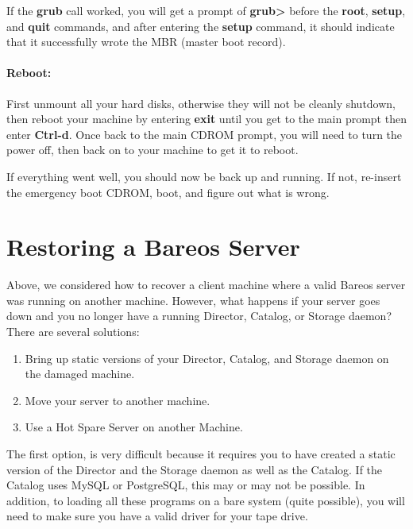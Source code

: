 If the {\bf grub} call worked, you will get a prompt of {\bf grub{\textgreater}}
before the {\bf root}, {\bf setup}, and {\bf quit} commands, and after
entering the {\bf setup} command, it should indicate that it successfully
wrote the MBR (master boot record).


\paragraph*{Reboot:}

First unmount all your hard disks, otherwise they will not be cleanly
shutdown, then reboot your machine by entering {\bf exit} until you get to the
main prompt then enter {\bf Ctrl-d}. Once back to the main CDROM prompt, you
will need to turn the power off, then back on to your machine to get it to
reboot.

If everything went well, you should now be back up and running. If not,
re-insert the emergency boot CDROM, boot, and figure out what is wrong.

\label{restore_server}
\section{Restoring a Bareos Server}

Above, we considered how to recover a client machine where a valid Bareos
server was running on another machine. However, what happens if your server
goes down and you no longer have a running Director, Catalog, or Storage
daemon? There are several solutions:

\begin{enumerate}
\item Bring up static versions of your Director, Catalog, and Storage  daemon
   on the damaged machine.

\item Move your server to another machine.

\item Use a Hot Spare Server on another Machine.
\end{enumerate}

The first option, is very difficult because it requires you to have created a
static version of the Director and the Storage daemon as well as the Catalog.
If the Catalog uses MySQL or PostgreSQL, this may or may not be possible. In
addition, to loading all these programs on a bare system (quite possible), you
will need to make sure you have a valid driver for your tape drive.

